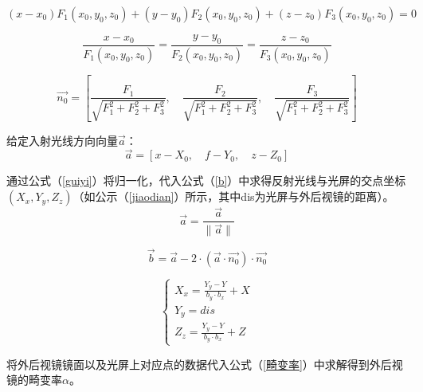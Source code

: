 \documentclass[bwprint]{cumcmthesis}
\begin{document}
\begin{equation}
\label{qiepingmian}
	(x - x_0)F_1(x_0,y_0,z_0) + (y - y_0)F_2(x_0,y_0,z_0) + (z - z_0)F_3(x_0,y_0,z_0) = 0
\end{equation}

\begin{equation}
\label{faxian}
	\frac{x - x_0}{F_1(x_0,y_0,z_0)} = \frac{y - y_0}{F_2(x_0,y_0,z_0)} = \frac{z - z_0}{F_3(x_0,y_0,z_0)} 
\end{equation}

\begin{equation}
\label{faxiangliang}
	\vec{n_0} = \left[\frac{F_1}{\sqrt{F_1^2+F_2^2+F_3^2}},\quad \frac{F_2}{\sqrt{F_1^2+F_2^2+F_3^2}},\quad \frac{F_3}{\sqrt{F_1^2+F_2^2+F_3^2}}\right]
\end{equation}
\par 给定入射光线方向向量$\vec{a}$：
\begin{equation}
	\vec{a} = [x - X_0,\quad f - Y_0, \quad z - Z_0 ]
\end{equation}
\par 通过公式（\ref{guiyi}）将归一化，代入公式（\ref{b}）中求得反射光线与光屏的交点坐标$(X_x,Y_y,Z_z)$（如公示（\ref{jiaodian}）所示，其中dis为光屏与外后视镜的距离）。
\begin{equation}
\label{guiyi}
	\vec{a} = \frac{\vec{a}}{\|\vec{a}\|}   
\end{equation}

\begin{equation}
\label{b}
	\vec{b} = \vec{a} - 2 \cdot (\vec{a} \cdot \vec{n_0}) \cdot \vec{n_0}
\end{equation}

\begin{equation}
\label{jiaodian}
	\begin{cases}
		X_x = \frac{Y_y - Y}{b_y \cdot b_x} + X \\
		Y_y = dis \\
		Z_z = \frac{Y_y - Y}{b_y \cdot b_x} + Z
	\end{cases}
\end{equation}

\par 将外后视镜镜面以及光屏上对应点的数据代入公式（\ref{畸变率}）中求解得到外后视镜的畸变率$\alpha$。
\end{document}
